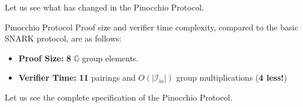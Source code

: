 \documentclass[../../book.tex]{subfiles}
\begin{document}
Let us see what has changed in the Pinocchio Protocol.

\begin{proposition}{Pinocchio Protocol}
    Proof size and verifier time complexity, compared to the basic SNARK protocol, are as follows:
    \begin{itemize}
        \item \textbf{Proof Size:} \textbf{8} $\mathbb{G}$ group elements.
        \item \textbf{Verifier Time:} \textbf{11} pairings and $O(|\mathcal{I}_{\text{io}}|)$ group multiplications (\textbf{4 less!})
    \end{itemize}
\end{proposition}

Let us see the complete specification of the Pinocchio Protocol.
\end{document}
